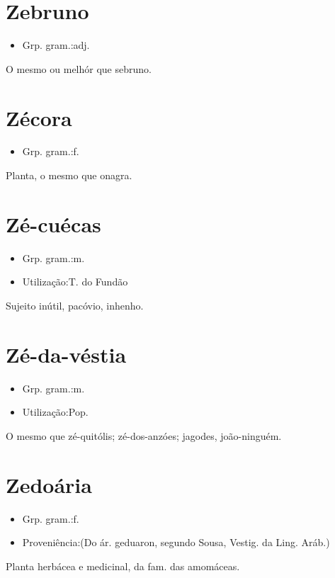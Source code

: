 \section{Zebruno}
\begin{itemize}
\item {Grp. gram.:adj.}
\end{itemize}
O mesmo ou melhór que \textunderscore sebruno\textunderscore .
\section{Zécora}
\begin{itemize}
\item {Grp. gram.:f.}
\end{itemize}
Planta, o mesmo que \textunderscore onagra\textunderscore .
\section{Zé-cuécas}
\begin{itemize}
\item {Grp. gram.:m.}
\end{itemize}
\begin{itemize}
\item {Utilização:T. do Fundão}
\end{itemize}
Sujeito inútil, pacóvio, inhenho.
\section{Zé-da-véstia}
\begin{itemize}
\item {Grp. gram.:m.}
\end{itemize}
\begin{itemize}
\item {Utilização:Pop.}
\end{itemize}
O mesmo que \textunderscore zé-quitólis\textunderscore ; zé-dos-anzóes; jagodes, joão-ninguém.
\section{Zedoária}
\begin{itemize}
\item {Grp. gram.:f.}
\end{itemize}
\begin{itemize}
\item {Proveniência:(Do ár. \textunderscore geduaron\textunderscore , segundo Sousa, \textunderscore Vestig. da Ling. Aráb.\textunderscore )}
\end{itemize}
Planta herbácea e medicinal, da fam. das amomáceas.

